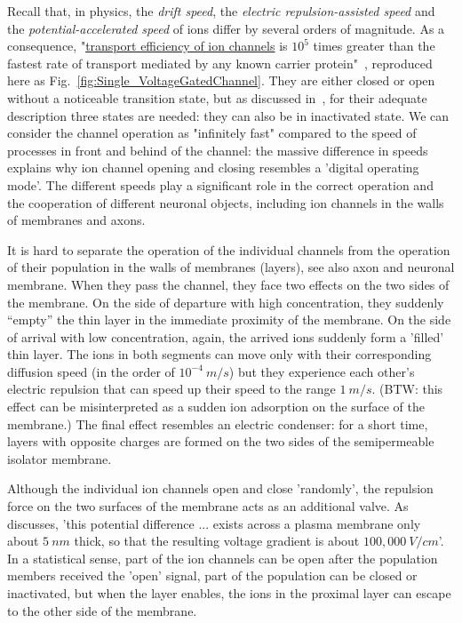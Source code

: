 Recall that, in physics, the \textit{drift speed}, the \textit{electric repulsion-assisted speed}
and the \textit{potential-accelerated speed} of
ions differ by  several orders of magnitude.
As a consequence, 
"\href{https://www.ncbi.nlm.nih.gov/books/NBK26910}
{transport efficiency of ion channels}
is  $10^5$ times greater than the fastest rate of transport mediated by any known carrier protein"~\cite{MolecularBiology:2002}, reproduced here as Fig.~\ref{fig:Single_VoltageGatedChannel}.
They are either closed or open without
a noticeable transition state, but as discussed in~\cite{ThreeStateUnidirectional:2004, MarkovianIonChannel:2005}, for their adequate description three states are needed:
they can also be in inactivated state.
We can consider the channel operation as "infinitely fast" compared
to the speed of processes in front and behind of the channel: the massive difference in speeds
explains why ion channel opening and closing resembles a 'digital
operating mode'.
The different speeds
play a significant role in the correct operation and
the cooperation of different neuronal objects, including ion channels
in the walls of membranes and axons.

It is hard to separate the operation of the individual channels
from the operation of their population in the walls of membranes (layers),
see also axon and neuronal membrane.
When they
pass the channel, they face two effects on the two sides of the membrane.
On the side of departure with high concentration, they suddenly ``empty''
the thin layer in the immediate proximity of the membrane. On the side of arrival with low concentration,
again, the arrived ions suddenly form a 'filled' thin layer.
The ions in both segments can move only with their corresponding diffusion speed
(in the order of $10^{-4}\ m/s$) but they experience each other's electric repulsion
that can speed up their speed to the range $1\ m/s$.
(BTW: this effect can be misinterpreted
as a sudden ion adsorption \cite{Hodgkin-HuxleyAdsorption:2021} on
the surface of the membrane.) The final effect resembles an electric condenser:
for a short time, layers with opposite charges are formed on the two sides
of the semipermeable isolator membrane.


Although the individual
ion channels open and close 'randomly', the repulsion force
on the two surfaces of the membrane acts as an additional valve.
As \cite{MolecularBiology:2002} discusses,
'this potential difference ... exists across a plasma membrane only about $5\ nm$ thick,
so that the resulting voltage gradient is about $100,000\ V/cm$'.
In a statistical sense, part of the ion channels can be open
after the population members received the 'open' signal, part of the population can be closed
or inactivated,
but when the layer enables, the ions in the proximal layer
can escape to the other side of the membrane.

